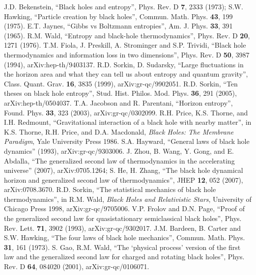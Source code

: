 \documentclass{article}
\begin{document}
\begin{thebibliography}{99}

J.D. Bekenstein, ``Black holes and entropy'', Phys. Rev. D \textbf{7}, 2333 (1973); S.W. Hawking, ``Particle creation by black holes'', Commun. Math. Phys. \textbf{43}, 199 (1975).
E.T. Jaynes, ``Gibbs vs Boltzmann entropies'', Am. J. Phys. \textbf{33}, 391 (1965).
R.M. Wald, ``Entropy and black-hole thermodynamics'', Phys. Rev. D \textbf{20}, 1271 (1976).
T.M. Fiola, J. Preskill, A. Strominger and S.P. Trividi, ``Black hole thermodynamics and information loss in two dimensions'', Phys. Rev. D \textbf{50}, 3987 (1994), arXiv:hep-th/9403137.
R.D. Sorkin, D. Sudarsky, ``Large fluctuations in the horizon area and what they can tell us about entropy and quantum gravity'', Class. Quant. Grav. \textbf{16}, 3835 (1999), arXiv:gr-qc/9902051.
R.D. Sorkin, ``Ten theses on black hole entropy'', Stud. Hist. Philos. Mod. Phys. \textbf{36}, 291 (2005), arXiv:hep-th/0504037.
T.A. Jacobson and R. Parentani, ``Horizon entropy'', Found. Phys. \textbf{33}, 323 (2003), arXiv:gr-qc/0302099.
R.H. Price, K.S. Thorne, and I.H. Redmount, ``Gravitational interaction of a black hole with nearby matter'',
in K.S. Thorne, R.H. Price, and D.A. Macdonald, \textit{Black Holes: The Membrane Paradigm}, Yale University Press 1986.
S.A. Hayward, ``General laws of black hole dynamics'' (1993), arXiv:gr-qc/9303006.
J. Zhou, B. Wang, Y. Gong, and E. Abdalla, ``The generalized second law of thermodynamics in the accelerating universe'' (2007), arXiv:0705.1264; S. He, H. Zhang, ``The black hole dynamical horizon and generalized second law of thermodynamics'', JHEP \textbf{12}, 052 (2007), arXiv:0708.3670.
R.D. Sorkin, ``The statistical mechanics of black hole thermodynamics'', in R.M. Wald, \textit{Black Holes and Relativistic Stars}, University of Chicago Press 1998, arXiv:gr-qc/9705006.
V.P. Frolov and D.N. Page, ``Proof of the generalized second law for quasistationary semiclassical black holes'', Phys. Rev. Lett. \textbf{71}, 3902 (1993), arXiv:gr-qc/9302017.
J.M. Bardeen, B. Carter and S.W. Hawking, ``The four laws of black hole mechanics'', Commun. Math. Phys. \textbf{31}, 161 (1973).
S. Gao, R.M. Wald, ``The `physical process' version of the first law and the generalized second law for charged and rotating black holes'', Phys. Rev. D \textbf{64}, 084020 (2001), arXiv:gr-qc/0106071.

\end{thebibliography}
\end{document}
